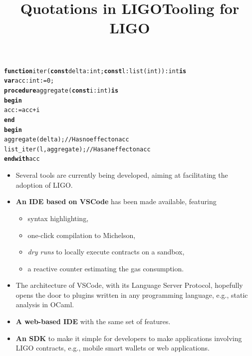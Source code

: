 \documentclass[wide]{slides}
\begin{document}
\begin{slide}
  \title{Quotations in LIGO}

\begin{alltt}
\textbf{function} iter (\textbf{const} delta : int; \textbf{const} l : list (int)) : int \textbf{is}
  \textbf{var} acc : int := 0;
  \textbf{procedure} aggregate (\textbf{const} i : int) \textbf{is}
    \textbf{begin}
      acc := acc + i
    \textbf{end}
  \textbf{begin}
    aggregate (delta);         // Has no effect on acc
    list\_iter (l, aggregate); // Has an effect on acc
  \textbf{end with} acc
\end{alltt}

\end{slide}

\begin{slide}
  \title{Tooling for LIGO}

  \begin{itemize}

    \item Several tools are currently being developed, aiming at
      facilitating the adoption of LIGO.

    \item \textbf{An IDE based on VSCode} has been made available,
      featuring
      \begin{itemize}

        \item syntax highlighting,

        \item one-click compilation to Michelson,

        \item \emph{dry runs} to locally execute contracts on a
          sandbox,

        \item a reactive counter estimating the gas consumption.

      \end{itemize}

    \item The architecture of VSCode, with its Language Server
      Protocol, hopefully opens the door to plugins written in any
      programming language, e.g., static analysis in OCaml.

    \item \textbf{A web-based IDE} with the same set of features.

    \item \textbf{An SDK} to make it simple for developers to make
      applications involving LIGO contracts, e.g., mobile smart
      wallets or web applications.

  \end{itemize}

\end{slide}
\end{document}
